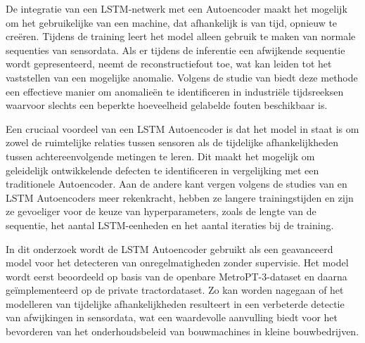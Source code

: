 {{{{{{{De integratie van een LSTM-netwerk met een Autoencoder maakt het mogelijk om het gebruikelijke van een machine, dat afhankelijk is van tijd, opnieuw te creëren. Tijdens de training leert het model alleen gebruik te maken van normale sequenties van sensordata. Als er tijdens de inferentie een afwijkende sequentie wordt gepresenteerd, neemt de reconstructiefout toe, wat kan leiden tot het vaststellen van een mogelijke anomalie. Volgens de studie van \textcite{Davari2021} biedt deze methode een effectieve manier om anomalieën te identificeren in industriële tijdsreeksen waarvoor slechts een beperkte hoeveelheid gelabelde fouten beschikbaar is.

Een cruciaal voordeel van een LSTM Autoencoder is dat het model in staat is om zowel de ruimtelijke relaties tussen sensoren als de tijdelijke afhankelijkheden tussen achtereenvolgende metingen te leren. Dit maakt het mogelijk om geleidelijk ontwikkelende defecten te identificeren in vergelijking met een traditionele Autoencoder. Aan de andere kant vergen volgens de studies van \textcite{Elahi2023} en \textcite{Li2025} LSTM Autoencoders meer rekenkracht, hebben ze langere trainingstijden en zijn ze gevoeliger voor de keuze van hyperparameters, zoals de lengte van de sequentie, het aantal LSTM-eenheden en het aantal iteraties bij de training.

In dit onderzoek wordt de LSTM Autoencoder gebruikt als een geavanceerd model voor het detecteren van onregelmatigheden zonder supervisie. Het model wordt eerst beoordeeld op basis van de openbare MetroPT-3-dataset en daarna geïmplementeerd op de private tractordataset. Zo kan worden nagegaan of het modelleren van tijdelijke afhankelijkheden resulteert in een verbeterde detectie van afwijkingen in sensordata, wat een waardevolle aanvulling biedt voor het bevorderen van het onderhoudsbeleid van bouwmachines in kleine bouwbedrijven.
    

\section{}%
\label{sec:{One-Class SVM-model}
    
}}}}}}}}
